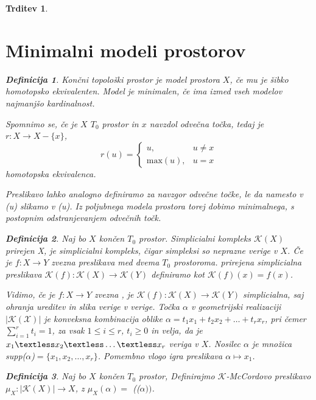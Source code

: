 \documentclass[a4paper,12pt]{article}
\theoremstyle{definition}
\newtheorem{definicija}{Definicija}
\theoremstyle{plain}
\theoremstyle{definition}
\theoremstyle{plain}
\newtheorem{trditev}{Trditev}
\theoremstyle{plain}
\theoremstyle{plain}
\theoremstyle{plain}
\begin{document}
\begin{trditev}
\section{Minimalni modeli prostorov}

\begin{definicija}
    Končni topološki prostor je \textit{model} prostora $X$, če mu je šibko homotopsko ekvivalenten. Model je \textit{minimalen}, če ima izmed vseh modelov najmanjšo kardinalnost.
\end{definicija}

Spomnimo se, če je $X$ $T_0$ prostor in $x$ navzdol odvečna točka, tedaj je $r: X \rightarrow X - \{x\}$, $$
r(u) = \begin{cases}
    u, & u \neq x \\
    \text{max}(u), & u = x
\end{cases}$$
homotopska ekvivalenca.

Preslikavo lahko analogno definiramo za navzgor odvečne točke, le da namesto v \textit{(u)} slikamo v \textit{(u)}. 
Iz poljubnega modela prostora torej dobimo minimalnega, s postopnim odstranjevanjem odvečnih točk.


\begin{definicija}
    Naj bo $X$ končen $T_0$ prostor. \textit{Simplicialni kompleks} $\mathcal{K}(X)$ \textit{prirejen X}, je simplicialni kompleks, čigar simpleksi so neprazne verige v $X$. Če je $f: X\rightarrow Y$ zvezna preslikava med dvema $T_0$ prostoroma. \textit{prirejena simplicialna preslikava} $\mathcal{K}(f):\mathcal{K}(X) \rightarrow \mathcal{K}(Y)$ definiramo kot $\mathcal{K}(f)(x) = f(x)$.
\end{definicija}
Vidimo, če je $f: X\rightarrow Y$ zvezna , je $\mathcal{K}(f):\mathcal{K}(X) \rightarrow \mathcal{K}(Y)$ simplicialna, saj ohranja ureditev in slika verige v verige.
Točka $\alpha$ v geometrijski realizaciji $|\mathcal{K(X)}|$ je
konveksna kombinacija oblike
$\alpha = t_1x_1+t_2x_2 + \ldots + t_r x_r$, pri čemer 
$\sum_{i=1}^{r}t_i=1$, za vsak $1 \le i \le r$, $t_i \ge 0$ in 
velja, da je $x_1 \textless x_2 \textless \ldots \textless x_r$ veriga v $X$.
Nosilec $\alpha$ je množica supp($\alpha$)$= \{x_1,x_2,\ldots,x_r\}$. Pomembno vlogo igra 
 preslikava $\alpha \mapsto x_1$.
 
 \begin{definicija}
    Naj bo $X$ končen $T_0$ prostor, Definirajmo
    $\mathcal{K}$-\textit{McCordovo} preslikavo $\mu_X:|\mathcal{K}
    (X)|\rightarrow X$, z $\mu_X(\alpha) =$
    (($\alpha))$.
\end{definicija}


\end{trditev}
\end{document}
